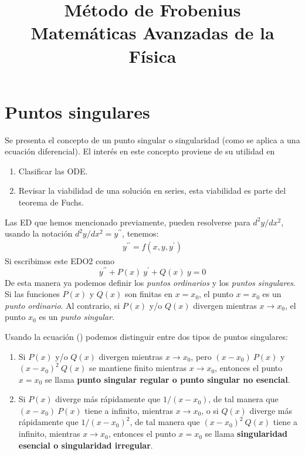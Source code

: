 
\title{ Método de Frobenius \\ \large {Matemáticas Avanzadas de la Física}}
\date{ }

\renewcommand\labelenumii{\theenumi.{\arabic{enumii}}}
\maketitle
\fontsize{14}{14}\selectfont
\section{Puntos singulares}
Se presenta el concepto de un punto singular o singularidad (como se aplica a una ecuación diferencial). El interés en este concepto proviene de su utilidad en
\begin{enumerate}
\item Clasificar las ODE.
\item Revisar la viabilidad de una solución en series, esta viabilidad es parte del teorema de Fuchs.
\end{enumerate}
\par
Las ED que hemos mencionado previamente, pueden resolverse para $d^{2}y/dx^{2}$, usando la notación $d^{2}y/dx^{2} = y^{\prime \prime}$, tenemos:
\begin{align}
y^{\prime \prime} = f(x, y, y^{\prime})
\label{eq:ecuacion_09_74}
\end{align}
Si escribimos este EDO2 como
\begin{equation}
y^{\prime \prime} + P(x) \: y^{\prime} + Q(x) \: y = 0
\label{eq:ecuacion_09_75}
\end{equation}
De esta manera ya podemos definir los \emph{puntos ordinarios} y los \emph{puntos singulares}. Si las funciones $P(x)$ y $Q(x)$ son finitas en $x = x_{0}$, el punto $x = x_{0}$ es un \emph{punto ordinario}. Al 
contrario, si $P(x)$ y/o $Q(x)$ divergen mientras $x \to x_{0}$, el punto $x_{0}$ es un \emph{punto singular}.
\par
Usando la ecuación () podemos distinguir entre dos tipos de puntos singulares:
\begin{enumerate}
\item Si $P(x)$ y/o $Q(x)$ divergen mientras $x \to x_{0}$, pero $(x - x_{0}) \: P(x)$ y $(x - x_{0})^{2} \: Q(x)$ se mantiene finito mientras $x \to x_{0}$, entonces el punto $x = x_{0}$ se llama \textbf{punto singular regular o punto singular no esencial}.
\item Si $P(x)$ diverge más rápidamente que $1/(x - x_{0})$, de tal manera que $(x - x_{0}) \: P(x)$ tiene a infinito, mientras $x \to x_{0}$, o si $Q(x)$ diverge más rápidamente que $1/(x - x_{0})^{2}$, de tal manera que $(x - x_{0})^{2} \: Q(x)$ tiene a infinito, mientras $x \to x_{0}$, entonces el punto $x = x_{0}$ se llama \textbf{singularidad esencial o singularidad irregular}.
\end{enumerate}
